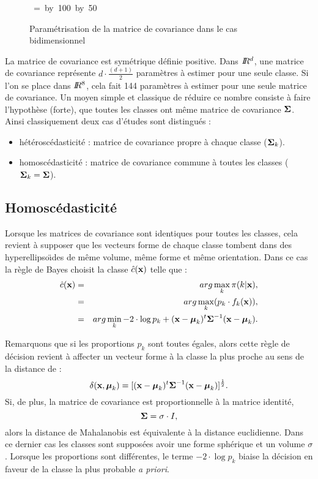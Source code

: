 \begin{figure}[hbtp]
\begin{center}
\leavevmode
\hbox
{
\epsfxsize=\textwidth
\divide\epsfxsize by 100
\multiply\epsfxsize by 50
}
\end{center}
\caption{Param\'etrisation de la matrice de covariance dans le cas
bidimensionnel}
\label{fig :param}
\end{figure}

La matrice de covariance est sym\'etrique d\'efinie positive. Dans
$I\!\!R^d$, une matrice de covariance repr\'esente  $d \cdot \frac{(d+1)}{2}$ param\`etres \`a estimer pour une seule classe. Si l'on se place dans $I\!\!R^8$, 
cela fait 144  param\`etres \`a estimer pour une
seule matrice de covariance.  
Un moyen simple et classique de r\'eduire ce nombre consiste \`a faire
l'hypoth\`ese (forte), que toutes les classes ont m\^eme matrice 
de covariance $\mbox{\boldmath $\Sigma$}$. Ainsi classiquement deux cas d'\'etudes
sont distingu\'es :
\begin{itemize}
\item h\'et\'erosc\'edasticit\'e : matrice de covariance propre \`a chaque classe ($\mbox{\boldmath $\Sigma$}_k$).
\item homosc\'edasticit\'e : matrice de covariance commune \`a toutes les classes ($\mbox{\boldmath $\Sigma$}_k=\mbox{\boldmath $\Sigma$}$).
\end{itemize}

\subsection{Homosc\'edasticit\'e}
Lorsque les matrices de covariance sont identiques pour toutes les
classes, cela revient \`a supposer que les vecteurs forme de chaque
classe tombent dans des hyperellipso\"{\i}des de m\^eme volume,
m\^eme forme et m\^eme orientation. Dans ce cas la r\`egle de
Bayes choisit la classe $\hat{c}(\mbox{\bf x})$ telle que :
\begin{eqnarray*}
\hat{c}(\mbox{\bf x}) & = & arg \max_k \pi (k | \mbox{\bf x} ),\\
            & = & arg \max_k (p_k \cdot f_k(\mbox{\bf x})),\\
            & = & arg \min_k -2 \cdot \log p_k  + (\mbox{\bf x} - \mbox{\boldmath $\mu$}_k)^t \mbox{\boldmath $\Sigma$}^{-1} (\mbox{\bf x} - \mbox{\boldmath $\mu$}_k).
\end{eqnarray*}

Remarquons que si les proportions $p_k$ sont toutes \'egales, alors cette r\`egle de
d\'ecision revient \`a affecter un vecteur forme \`a la classe la plus proche au
sens de la distance de  :
$$
\delta(\mbox{\bf x},\mbox{\boldmath $\mu$}_k)=[(\mbox{\bf x} - \mbox{\boldmath $\mu$}_k)^t \mbox{\boldmath $\Sigma$}^{-1} (\mbox{\bf x} - \mbox{\boldmath $\mu$}_k)]^{\frac{1}{2}}.
$$ 
Si, de plus, la matrice de covariance est proportionnelle \`a la matrice identit\'e,
$$
\mbox{\boldmath $\Sigma$}=\sigma \cdot I,
$$
alors la distance de Mahalanobis est \'equivalente \`a la distance euclidienne. Dans ce dernier
cas les classes sont suppos\'ees avoir une forme sph\'erique et un volume $\sigma$.
Lorsque les proportions sont diff\'erentes, le terme $-2 \cdot \log p_k$ biaise la 
d\'ecision en faveur de la classe la plus probable {\em a priori}.


